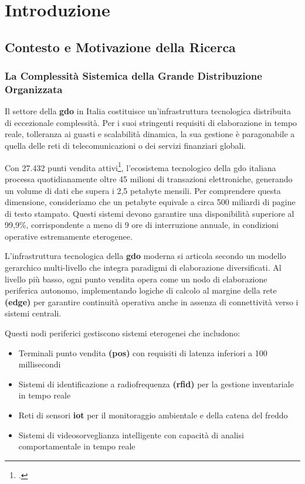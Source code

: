 \chapter{\texorpdfstring{Introduzione}{Capitolo 1 - Introduzione}}
\label{cap:introduzione}

\section{\texorpdfstring{Contesto e Motivazione della Ricerca}{1.1 - Contesto e Motivazione della Ricerca}}
\label{sec:contesto_motivazione}

\subsection{\texorpdfstring{La Complessità Sistemica della Grande Distribuzione Organizzata}{1.1.1 - La Complessità Sistemica della Grande Distribuzione Organizzata}}
\label{subsec:complessita_sistemica}

Il settore della \textbf{\gls{gdo}} in Italia costituisce un'infrastruttura tecnologica distribuita di eccezionale complessità. Per i suoi stringenti requisiti di elaborazione in tempo reale, tolleranza ai guasti e scalabilità dinamica, la sua gestione è paragonabile a quella delle reti di telecomunicazioni o dei servizi finanziari globali.

Con 27.432 punti vendita attivi\footcite{istat2024}, l'ecosistema tecnologico della \gls{gdo} italiana processa quotidianamente oltre 45 milioni di transazioni elettroniche, generando un volume di dati che supera i 2,5 petabyte mensili. Per comprendere questa dimensione, consideriamo che un petabyte equivale a circa 500 miliardi di pagine di testo stampato. Questi sistemi devono garantire una disponibilità superiore al 99,9\%, corrispondente a meno di 9 ore di interruzione annuale, in condizioni operative estremamente eterogenee.

L'infrastruttura tecnologica della \textbf{\gls{gdo}} moderna si articola secondo un modello gerarchico multi-livello che integra paradigmi di elaborazione diversificati. Al livello più basso, ogni punto vendita opera come un nodo di elaborazione periferica autonomo, implementando logiche di calcolo al margine della rete\textbf{ (\gls{edge})} per garantire continuità operativa anche in assenza di connettività verso i sistemi centrali. 

Questi nodi periferici gestiscono sistemi eterogenei che includono:
\begin{itemize}
\item Terminali punto vendita \textbf{(\gls{pos})} con requisiti di latenza inferiori a 100 millisecondi
\item Sistemi di identificazione a radiofrequenza \textbf{(\gls{rfid})} per la gestione inventariale in tempo reale
\item Reti di sensori \textbf{\gls{iot}} per il monitoraggio ambientale e della catena del freddo
\item Sistemi di videosorveglianza intelligente con capacità di analisi comportamentale in tempo reale
\end{itemize}

